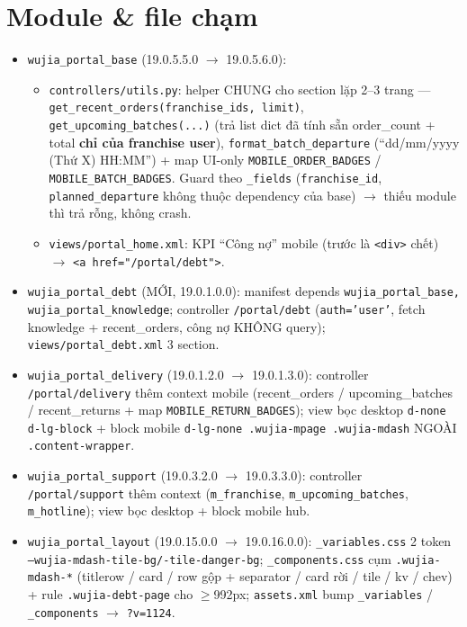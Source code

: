 \section{Module \& file chạm}

\begin{itemize}
  \item \texttt{wujia\_portal\_base} (19.0.5.5.0 \(\rightarrow\) 19.0.5.6.0):
    \begin{itemize}
      \item \texttt{controllers/utils.py}: helper CHUNG cho section lặp 2--3 trang ---
            \texttt{get\_recent\_orders(franchise\_ids, limit)},
            \texttt{get\_upcoming\_batches(...)} (trả list dict đã tính sẵn order\_count
            + total \textbf{chỉ của franchise user}), \texttt{format\_batch\_departure}
            (``dd/mm/yyyy (Thứ X) \textbullet{} HH:MM'') + map UI-only
            \texttt{MOBILE\_ORDER\_BADGES} / \texttt{MOBILE\_BATCH\_BADGES}. Guard theo
            \texttt{\_fields} (\texttt{franchise\_id}, \texttt{planned\_departure} không
            thuộc dependency của base) \(\rightarrow\) thiếu module thì trả rỗng, không
            crash.
      \item \texttt{views/portal\_home.xml}: KPI ``Công nợ'' mobile (trước là
            \texttt{<div>} chết) \(\rightarrow\) \texttt{<a href="/portal/debt">}.
    \end{itemize}
  \item \texttt{wujia\_portal\_debt} (MỚI, 19.0.1.0.0): manifest depends
        \texttt{wujia\_portal\_base, wujia\_portal\_knowledge}; controller
        \texttt{/portal/debt} (\texttt{auth='user'}, fetch knowledge + recent\_orders,
        công nợ KHÔNG query); \texttt{views/portal\_debt.xml} 3 section.
  \item \texttt{wujia\_portal\_delivery} (19.0.1.2.0 \(\rightarrow\) 19.0.1.3.0): controller
        \texttt{/portal/delivery} thêm context mobile (recent\_orders / upcoming\_batches
        / recent\_returns + map \texttt{MOBILE\_RETURN\_BADGES}); view bọc desktop
        \texttt{d-none d-lg-block} + block mobile \texttt{d-lg-none .wujia-mpage
        .wujia-mdash} NGOÀI \texttt{.content-wrapper}.
  \item \texttt{wujia\_portal\_support} (19.0.3.2.0 \(\rightarrow\) 19.0.3.3.0): controller
        \texttt{/portal/support} thêm context (\texttt{m\_franchise},
        \texttt{m\_upcoming\_batches}, \texttt{m\_hotline}); view bọc desktop + block
        mobile hub.
  \item \texttt{wujia\_portal\_layout} (19.0.15.0.0 \(\rightarrow\) 19.0.16.0.0):
        \texttt{\_variables.css} 2 token \texttt{--wujia-mdash-tile-bg/-tile-danger-bg};
        \texttt{\_components.css} cụm \texttt{.wujia-mdash-*} (titlerow / card / row gộp +
        separator / card rời / tile / kv / chev) + rule \texttt{.wujia-debt-page} cho
        \(\geq\)992px; \texttt{assets.xml} bump \texttt{\_variables} / \texttt{\_components}
        \(\rightarrow\) \texttt{?v=1124}.
\end{itemize}

